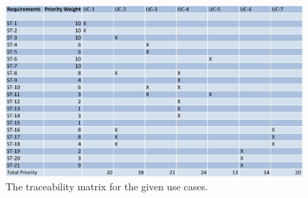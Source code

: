 \begin{figure}
\centering
\includegraphics[width=5.5in]{./img/traceability.png}
\caption{The traceability matrix for the given use cases.}
\end{figure}

\newpage

